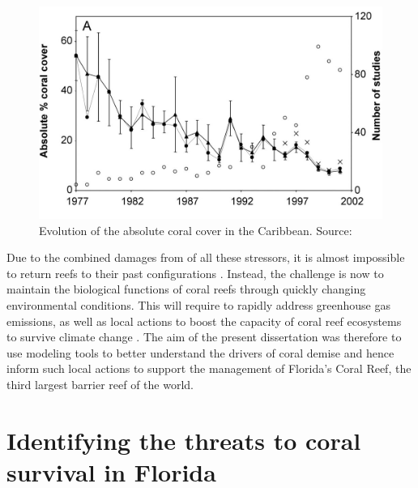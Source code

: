 \begin{figure}
    \centering
    \includegraphics[width=.9\textwidth]{chapters/intro/figures/cover.jpeg}
    \caption{Evolution of the absolute coral cover in the Caribbean. Source: \cite{gardner2003long}}
    \label{intro:cover}
\end{figure}

Due to the combined damages from of all these stressors, it is almost impossible to return reefs to their past configurations \citep{hughes2017coral}. Instead, the challenge is now to maintain the biological functions of coral reefs through quickly changing environmental conditions. This will require to rapidly address greenhouse gas emissions, as well as local actions to boost the capacity of coral reef ecosystems to survive climate change \citep{hughes2003climate,knowlton2008shifting,graham2015predicting,kleypas2021designing}. The aim of the present dissertation was therefore to use modeling tools to better understand the drivers of coral demise and hence inform such local actions to support the management of Florida's Coral Reef, the third largest barrier reef of the world.

\section{Identifying the threats to coral survival in Florida}

